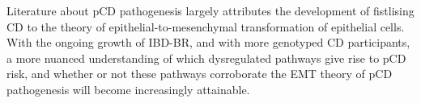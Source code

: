 Literature about pCD pathogenesis largely attributes the development of fistlising CD to the theory of epithelial-to-mesenchymal transformation of epithelial cells. With the ongoing growth of IBD-BR, and with more genotyped CD participants, a more nuanced understanding of which dysregulated pathways give rise to pCD risk, and whether or not these pathways corroborate the EMT theory of pCD pathogenesis will become increasingly attainable.











